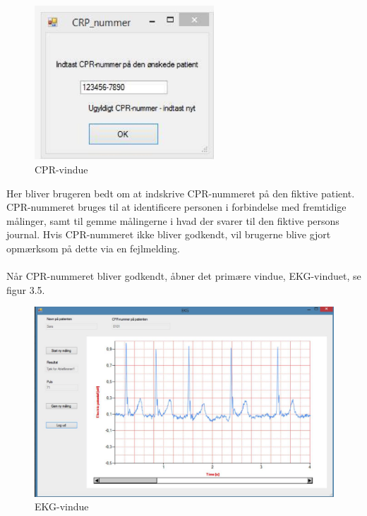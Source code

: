 \begin{figure}[H]
	\centering
	\includegraphics[width=0.6\textwidth]{Figurer/Snip20150430_39}
	\caption{CPR-vindue}
\end{figure} 

Her bliver brugeren bedt om at indskrive CPR-nummeret på den fiktive patient. CPR-nummeret bruges til at identificere personen i forbindelse med fremtidige målinger, samt til gemme målingerne i hvad der svarer til den fiktive persons journal. Hvis CPR-nummeret ikke bliver godkendt, vil brugerne blive gjort opmærksom på dette via en fejlmelding. 
\\
\\
Når CPR-nummeret bliver godkendt, åbner det primære vindue, EKG-vinduet, se figur 3.5. 

\begin{figure}[H]
	\centering
	\includegraphics[width=1\textwidth]{Figurer/Snip20150522_17}
	\caption{EKG-vindue}
\end{figure}


